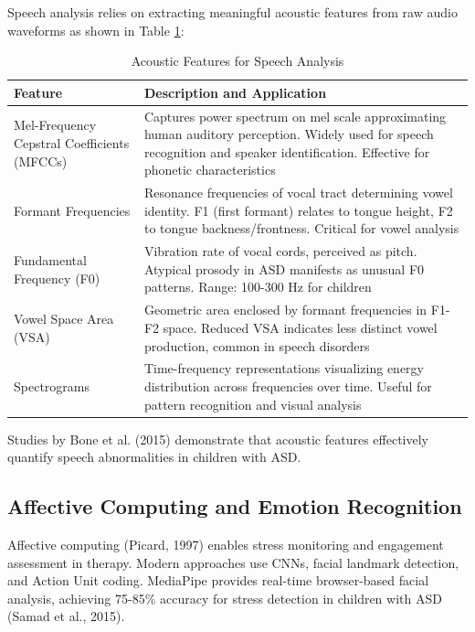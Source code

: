\documentclass[12pt,a4paper]{article}
\begin{document}
Speech analysis relies on extracting meaningful acoustic features from raw audio waveforms as shown in Table \ref{tab:acoustic_features}:

\begin{table}[H]
\centering
\caption{Acoustic Features for Speech Analysis}
\label{tab:acoustic_features}
\small
\begin{tabular}{p{4cm}p{9.5cm}}
\toprule
\textbf{Feature} & \textbf{Description and Application} \\
\midrule
Mel-Frequency Cepstral Coefficients (MFCCs) & Captures power spectrum on mel scale approximating human auditory perception. Widely used for speech recognition and speaker identification. Effective for phonetic characteristics \\
\hline
Formant Frequencies & Resonance frequencies of vocal tract determining vowel identity. F1 (first formant) relates to tongue height, F2 to tongue backness/frontness. Critical for vowel analysis \\
\hline
Fundamental Frequency (F0) & Vibration rate of vocal cords, perceived as pitch. Atypical prosody in ASD manifests as unusual F0 patterns. Range: 100-300 Hz for children \\
\hline
Vowel Space Area (VSA) & Geometric area enclosed by formant frequencies in F1-F2 space. Reduced VSA indicates less distinct vowel production, common in speech disorders \\
\hline
Spectrograms & Time-frequency representations visualizing energy distribution across frequencies over time. Useful for pattern recognition and visual analysis \\
\bottomrule
\end{tabular}
\end{table}

Studies by Bone et al. (2015) demonstrate that acoustic features effectively quantify speech abnormalities in children with ASD.

\subsection{Affective Computing and Emotion Recognition}

Affective computing (Picard, 1997) enables stress monitoring and engagement assessment in therapy. Modern approaches use CNNs, facial landmark detection, and Action Unit coding. MediaPipe provides real-time browser-based facial analysis, achieving 75-85\% accuracy for stress detection in children with ASD (Samad et al., 2015).
\end{document}
